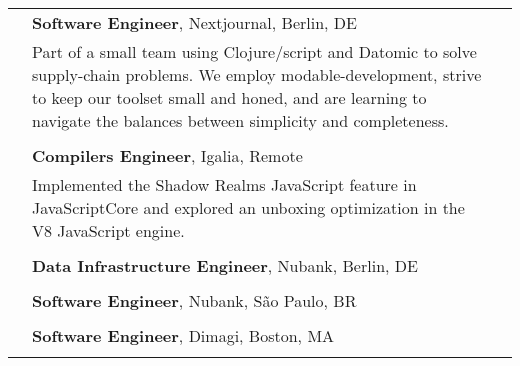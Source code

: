 \documentclass[10pt]{article}
\makeatletter
\renewcommand{\labelitemi}{$\cdot$}
\newenvironment{packeditem}{
\vspace{-5mm}
\begin{itemize}[leftmargin=*,labelindent=8pt]
  \renewcommand{\labelitemi}{$\diamond$}
  \setlength{\itemsep}{1pt}
  \setlength{\parskip}{0pt}
  \setlength{\parsep}{0pt}
}{\end{itemize}}
\newcommand{\category}[2]{
\begin{center}
\vskip 6pt
\begin{tabular*}{\textwidth}{@{}p{0.75in}@{\quad\;\;}p{4in}@{\quad\quad}p{0.7in}}
\vcrush[t]{1in}{\textsc{#1}} &
#2
\end{tabular*}
\end{center}
}
\newcommand{\n}{\\ & }
\newcommand{\conf}[1]{&\hspace{\stretch 1}\crushr{\textit{#1}}}
\makeatother
\begin{document}
\category{Experience}{
{\bf Software Engineer}, Nextjournal, Berlin, DE\conf{2022 -- Jul. 2024}\n
Part of a small team using Clojure/script and Datomic to solve supply-chain problems. We employ modable-development, strive to keep our toolset small and honed, and are learning to navigate the balances between simplicity and completeness.\n\n

{\bf Compilers Engineer}, Igalia, Remote\conf{Aug. -- Dec. 2021}\n
Implemented the Shadow Realms JavaScript feature in JavaScriptCore and explored an unboxing optimization in the V8 JavaScript engine.\n\n

{\bf Data Infrastructure Engineer}, Nubank, Berlin, DE\conf{2017 -- 2021}\n
\begin{packeditem}
\item \emph{Data infrastructure:} Innovating over our ETL for Datomic-backed services and developing data processing tools used by hundreds of internal clients.
\item \emph{Testing frameworks:} Maintainer of several key testing tools at Nubank.
\item \emph{Technical lead:} Set technical priorities for a small team focused on data ingestion and publishing.
\end{packeditem}\n

{\bf Software Engineer}, Nubank, S\~{a}o Paulo, BR \conf{Feb. -- Oct. 2017}\n
\begin{packeditem}
\item \emph{Microservices:} Build and maintain microservices in Clojure for a mobile-driven credit card product
\item \emph{Engineering productivity:} Build tools and improve core Clojure libraries to boost the eﬃciency of a 100+ engineering team.
\end{packeditem}\n

{\bf Software Engineer}, Dimagi, Boston, MA \conf{2015 -- 2017}\n
\begin{packeditem}
\item \emph{CommCare:} improved stability and performance of an Android app used by tens of thousands of users world-wide. Implemented new features for users with low tech literacy.
\item \emph{Tests:} established unit-level Robolectric and UI-level Calabash test systems for Android. Built an integration test-suite between mobile and server apps. Setup cross-repository CI system.
\item \emph{Legacy code:} performed substantial refactors on a 5-year-old production legacy codebase. Migrated from Java 3 to 8 and from the Ant to Gradle build system.
\item \emph{User empathy:} Worked with users to make development in the CommCare app building platform more approachable and efficient.
\end{packeditem}

}
\end{document}
